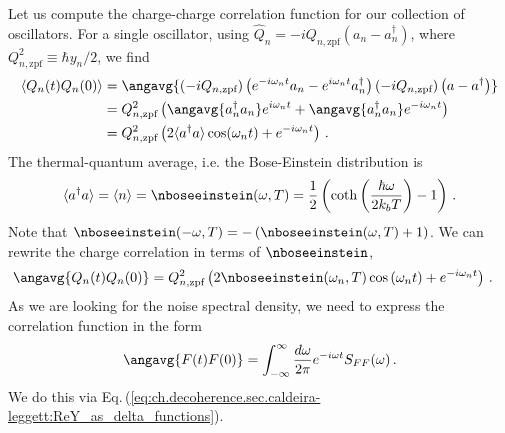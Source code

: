 
Let us compute the charge-charge correlation function for our collection of oscillators.
For a single oscillator, using $\hat{Q}_n = -i Q_{n,\text{zpf}} (a_n - a_n^\dagger)$, where $Q_{n,\text{zpf}}^2 \equiv \hbar y_n / 2$, we find
\begin{align}
  \langle Q_n(t) Q_n(0) \rangle
  &= \angavg{(-i Q_{n, \text{zpf}}) \left(e^{-i \omega_n t} a_n - e^{i \omega_n t} a_n^\dagger \right) (-i Q_{n,\text{zpf}}) \left( a - a^\dagger \right)} \nonumber \\
  &= Q_{n,\text{zpf}}^2 \left( \angavg{a_n^\dagger a_n} e^{i \omega_n t} + \angavg{ a_n^\dagger a_n} e^{-i \omega_n t} \right) \nonumber \\
  &= Q_{n,\text{zpf}}^2 \left( 2\langle a^\dagger a \rangle \cos(\omega_n t) + e^{-i \omega_n t} \right)
  \, .
\end{align}
The thermal-quantum average, i.e. the Bose-Einstein distribution is
\begin{equation}
  \langle a^\dagger a \rangle = \langle n \rangle = \nboseeinstein(\omega, T) = \frac{1}{2} \left( \coth \left( \frac{\hbar \omega}{2 k_b T} \right) - 1 \right)
  \, .
\end{equation}
Note that $\nboseeinstein(-\omega, T) = - \left( \nboseeinstein(\omega, T) + 1 \right)$.
We can rewrite the charge correlation in terms of $\nboseeinstein$,
\begin{align}
  \angavg{ Q_n(t) Q_n(0) }
  &= Q_{n, \text{zpf}}^2
  \left(
    2 \nboseeinstein (\omega_n, T) \cos \left( \omega_n t \right)
    + e^{-i \omega_n t}
  \right)
  \, .
\end{align}
As we are looking for the noise spectral density, we need to express the correlation function in the form
\begin{equation}
  \angavg{F(t)F(0)} = \int_{-\infty}^\infty \frac{d\omega}{2\pi} e^{-i \omega t} S_{FF}(\omega)
  \, .
\end{equation}
We do this via Eq.\,(\ref{eq:ch.decoherence.sec.caldeira-leggett:ReY_as_delta_functions}).
